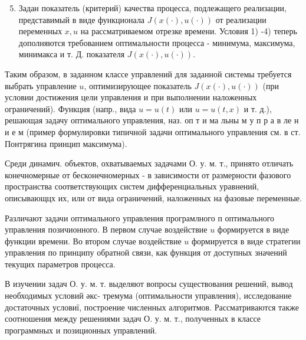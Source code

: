 \documentclass[10pt]{article}
\begin{document}
\begin{enumerate}
  \setcounter{enumi}{4}
  \item Задан показатель (критерий) качества процесса, подлежащего реализации, представимый в виде функционала $J(x(\cdot), u(\cdot))$ от реализации переменных $x, u$ на рассматриваемом отрезке времени. Условия 1) -4) теперь дополняются требованием оптимальности процесса - минимума, максимума, минимакса и т. Д. показателя $J(x(\cdot), u(\cdot))$.
\end{enumerate}

Таким образом, в заданном классе управлений для заданной системы требуется выбрать управление $u$, оптимизирующее показатель $J(x(\cdot), u(\cdot))$ (при условии достижения цели управления и при выполнении наложенных ограничений). Функция (напр., вида $u=u(t)$ или $u=u(t, x)$ и т. д.), решающая задачу оптимального управления, наз. оп т и ма льны м у п р а в ле н и е м (пример формулировки типичной задачи оптимального управления см. в ст. Понтрягина принцип максимума).

Среди динамич. объектов, охватываемых задачами О. у. м. т., принято отличать конечномерные от бесконечномерных - в зависимости от размерности фазового пространства соответствующих систем дифференциальных уравнений, описывающцх их, или от вида ограничений, наложенных на фазовые переменные.

Различают задачи оптимального управления програмлного п оптимального управления позичионного. В первом случае воздействие $u$ формируется в виде функции времени. Во втором случае воздействие $u$ формируется в виде стратегии управления по принципу обратной связи, как функция от доступных значений текущих параметров процесса.

В изучении задач О. у. м. т. выделяют вопросы существования решений, вывод необходимых условий әкс- тремума (оптимальности управления), исследование достаточных условиї, построение численных алгоритмов. Рассматриваются также соотношения между решениями задач О. у. м. т., полученных в классе программных и позиционных управлений.
\end{document}
